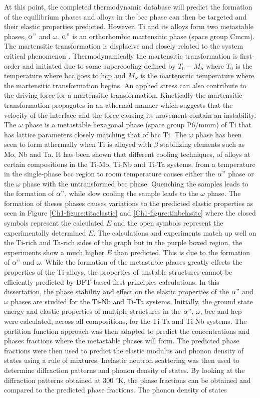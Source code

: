 At this point, the completed thermodynamic database will predict the formation of the equilibrium phases and alloys in the bcc phase can then be targeted and their elastic properties predicted. However, Ti and its alloys form two metastable phases, $\alpha"$ and $\omega$. $\alpha"$ is an orthorhombic martensitic phase (space group Cmcm). The martensitic transformation is displacive and closely related to the system critical phenomenon \cite{Khachaturyan1985,Salje1990}. Thermodynamically the martensitic transformation is first-order and initiated due to some supercooling defined by $T_{0}-M_{S}$ where $T_{0}$ is the temperature where bcc goes to hcp and $M_{S}$ is the martensitic temperature where the martensitic transformation begins. An applied stress can also contribute to the driving force for a martensitic transformation. Kinetically the martensitic transformation propagates in an athermal manner which suggests that the velocity of the interface and the force causing its movement contain an instability. The $\omega$ phase is a metastable hexagonal phase (space group P6/mmm) of Ti that has lattice parameters closely matching that of bcc Ti. The $\omega$ phase has been seen to form athermally when Ti is alloyed with $\beta$ stabilizing elements such as Mo, Nb and Ta. It has been shown that different cooling techniques, of alloys at certain compositions in the Ti-Mo, Ti-Nb and Ti-Ta systems, from a temperature in the single-phase bcc region to room temperature causes either the $\alpha"$ phase or the $\omega$ phase with the untransformed bcc phase. Quenching the samples leads to the formation of $\alpha"$, while slow cooling the sample leads to the $\omega$ phase. The formation of theses phases causes variations to the predicted elastic properties as seen in Figure \ref{Ch1-figure:titaelastic} and \ref{Ch1-figure:tinbelasitc} where the closed symbols represent the calculated $E$ and the open symbols represent the experimentally determined $E$. The calculations and experiments match up well on the Ti-rich and Ta-rich sides of the graph but in the purple boxed region, the experiments show a much higher $E$ than predicted. This is due to the formation of $\alpha"$ and $\omega$. While the formation of the metastable phases greatly effects the properties of the Ti-alloys, the properties of unstable structures cannot be efficiently predicted by DFT-based first-principles calculations. In this dissertation, the phase stability and effect on the elastic properties of the $\alpha"$ and $\omega$ phases are studied for the Ti-Nb and Ti-Ta systems. Initially, the ground state energy and elastic properties of multiple structures in the $\alpha"$, $\omega$, bcc and hcp were calculated, across all compositions, for the Ti-Ta and Ti-Nb systems. The partition function approach was then adapted to predict the concentrations and phases fractions where the metastable phases will form. The predicted phase fractions were then used to predict the elastic modulus and phonon density of states using a rule of mixtures. Inelastic neutron scattering was then used to determine diffraction patterns and phonon density of states. By looking at the diffraction patterns obtained at 300 $^\circ$K, the phase fractions can be obtained and compared to the predicted phase fractions. The phonon density of states 